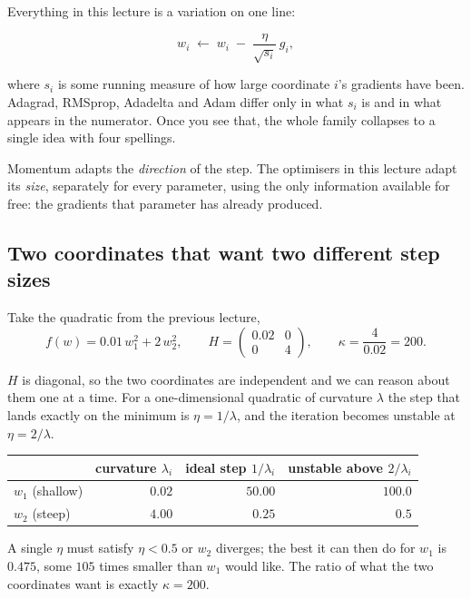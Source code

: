 \documentclass[11pt]{article}
\begin{document}
Everything in this lecture is a variation on one line:

\begin{equation}
  \label{eq:master}
  w_i \;\leftarrow\; w_i \;-\; \frac{\eta}{\sqrt{s_i}}\, g_i ,
\end{equation}

where $s_i$ is some running measure of how large coordinate $i$'s gradients
have been. Adagrad, RMSprop, Adadelta and Adam differ only in what $s_i$ is and
in what appears in the numerator. Once you see that, the whole family collapses
to a single idea with four spellings.

\begin{keyidea}
Momentum adapts the \emph{direction} of the step. The optimisers in this
lecture adapt its \emph{size}, separately for every parameter, using the only
information available for free: the gradients that parameter has already
produced.
\end{keyidea}

\subsection{Two coordinates that want two different step sizes}

\begin{worked}
Take the quadratic from the previous lecture,
\[
  f(w) = 0.01\,w_1^2 + 2\,w_2^2,
  \qquad
  H = \begin{pmatrix} 0.02 & 0\\ 0 & 4\end{pmatrix},
  \qquad
  \kappa = \frac{4}{0.02} = 200 .
\]

$H$ is diagonal, so the two coordinates are independent and we can reason about
them one at a time. For a one-dimensional quadratic of curvature $\lambda$ the
step that lands exactly on the minimum is $\eta = 1/\lambda$, and the
iteration becomes unstable at $\eta = 2/\lambda$.

\begin{center}
\begin{tabular}{@{}lrrr@{}}
\toprule
& curvature $\lambda_i$ & ideal step $1/\lambda_i$ & unstable above $2/\lambda_i$\\
\midrule
$w_1$ (shallow) & $0.02$ & $50.00$ & $100.0$\\
$w_2$ (steep)   & $4.00$ & $0.25$  & $0.5$\\
\bottomrule
\end{tabular}
\end{center}

A single $\eta$ must satisfy $\eta < 0.5$ or $w_2$ diverges; the best it can
then do for $w_1$ is $0.475$, some $105$ times smaller than $w_1$ would like.
The ratio of what the two coordinates want is exactly $\kappa = 200$.
\end{worked}
\end{document}

